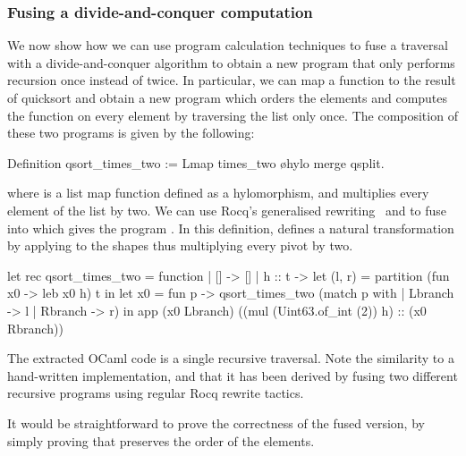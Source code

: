 \documentclass[a4paper,UKenglish,cleveref, autoref, thm-restate]{lipics-v2021}
\begin{document}
\subsubsection{Fusing a divide-and-conquer computation}
We now show how we can use program calculation techniques to fuse a traversal
with a  divide-and-conquer algorithm to obtain a new program that only performs
recursion once instead of twice. In particular, we can map a function to the
result of quicksort and obtain a new program which orders the elements and
computes the function on every element by traversing the list only once. The
composition of these two programs is given by the following:
\begin{coqcode}
Definition qsort_times_two := Lmap times_two \o hylo merge qsplit.
\end{coqcode}
where  is a list map function defined as a hylomorphism, and
 multiplies every element of the list by two. We can use Rocq's
generalised rewriting~\cite{Sozeau09} and  to fuse  into
 which gives the program .
In this definition,  defines a natural transformation by applying
 to the shapes thus multiplying every pivot by two.

\begin{ocamlcode}
let rec qsort_times_two = function | [] -> []
| h :: t -> let (l, r) = partition (fun x0 -> leb x0 h) t in
            let x0 = fun p -> qsort_times_two (match p with
                                 | Lbranch -> l | Rbranch -> r) in
            app (x0 Lbranch) ((mul (Uint63.of_int (2)) h) :: (x0 Rbranch))
\end{ocamlcode}
The extracted OCaml code is a single recursive traversal. Note the similarity to
a hand-written implementation, and that it has been derived by fusing two
different recursive programs using regular Rocq rewrite tactics.

It would be straightforward to prove the correctness of the fused version, by
simply proving that  preserves the order of the elements.
\newcommand{\Id}{\text{Id}}
\end{document}
